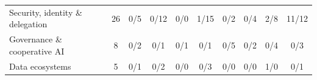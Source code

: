 \documentclass[conference]{IEEEtran}
\begin{document}
\begin{table}[t]
\begin{tabular}{l c cccccccc}
Security, identity \& delegation & 26 & \cellcolor{cellblue!7}0/5 & \cellcolor{cellblue!16}0/12 & \cellcolor{cellblue!0}0/0 & \cellcolor{cellblue!23}1/15 & \cellcolor{cellblue!3}0/2 & \cellcolor{cellblue!5}0/4 & \cellcolor{cellblue!16}2/8 & \cellcolor{cellblue!46}11/12 \\
Governance \& cooperative AI & 8 & \cellcolor{cellblue!9}0/2 & \cellcolor{cellblue!4}0/1 & \cellcolor{cellblue!4}0/1 & \cellcolor{cellblue!4}0/1 & \cellcolor{cellblue!22}0/5 & \cellcolor{cellblue!9}0/2 & \cellcolor{cellblue!18}0/4 & \cellcolor{cellblue!13}0/3 \\
Data ecosystems & 5 & \cellcolor{cellblue!7}0/1 & \cellcolor{cellblue!14}0/2 & \cellcolor{cellblue!0}0/0 & \cellcolor{cellblue!21}0/3 & \cellcolor{cellblue!0}0/0 & \cellcolor{cellblue!0}0/0 & \cellcolor{cellblue!14}1/0 & \cellcolor{cellblue!7}0/1 \\
\bottomrule
\end{tabular}
\end{table}
\end{document}
